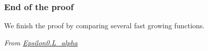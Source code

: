 










  
\subsubsection{End of the proof}

We finish the proof by comparing several fast growing functions.

\emph{From \href{../theories/html/hydras.Epsilon0.L_alpha.html}{Epsilon0.L\_alpha}}




